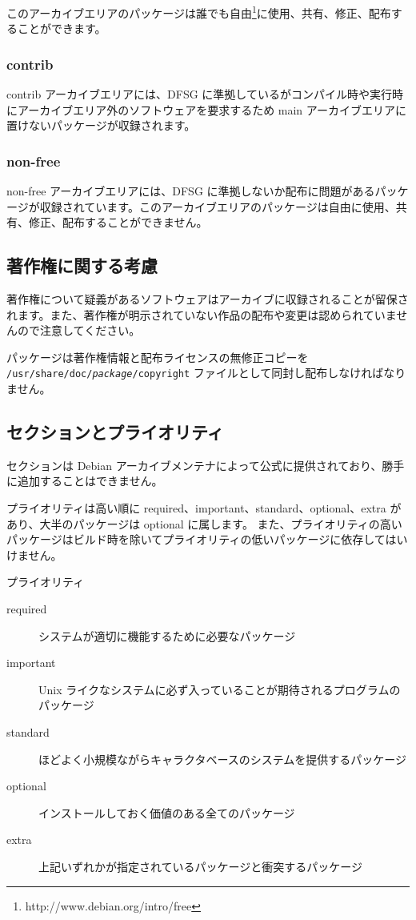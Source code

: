 \documentclass[mingoth,a4paper]{jsarticle}
\begin{document}
このアーカイブエリアのパッケージは誰でも自由\footnote{http://www.debian.org/intro/free}に使用、共有、修正、配布することができます。

\subsubsection{contrib}
contrib アーカイブエリアには、DFSG に準拠しているがコンパイル時や実行時にアーカイブエリア外のソフトウェアを要求するため main アーカイブエリアに置けないパッケージが収録されます。

\subsubsection{non-free}
non-free アーカイブエリアには、DFSG に準拠しないか配布に問題があるパッケージが収録されています。このアーカイブエリアのパッケージは自由に使用、共有、修正、配布することができません。

\subsection{著作権に関する考慮}
著作権について疑義があるソフトウェアはアーカイブに収録されることが留保されます。また、著作権が明示されていない作品の配布や変更は{\large 認められていません}ので注意してください。

パッケージは著作権情報と配布ライセンスの無修正コピーを \texttt{/usr/share/doc/{\it package}/copyright} ファイルとして同封し配布しなければなりません。


\subsection{セクションとプライオリティ}
セクションは Debian アーカイブメンテナによって公式に提供されており、勝手に追加することはできません。

プライオリティは高い順に required、important、standard、optional、extra があり、大半のパッケージは optional に属します。
また、プライオリティの高いパッケージはビルド時を除いてプライオリティの低いパッケージに依存してはいけません。

\begin{itembox}[l]{プライオリティ}
\begin{description}
\item [required] システムが適切に機能するために必要なパッケージ
\item [important] Unix ライクなシステムに必ず入っていることが期待されるプログラムのパッケージ
\item [standard] ほどよく小規模ながらキャラクタベースのシステムを提供するパッケージ
\item [optional] インストールしておく価値のある全てのパッケージ
\item [extra] 上記いずれかが指定されているパッケージと衝突するパッケージ
\end{description}
\end{itembox}
\end{document}
